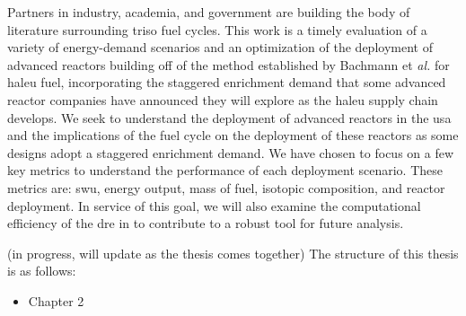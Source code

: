 Partners in industry, academia, and government are building the body of
literature surrounding \gls{triso} fuel cycles. This work is a timely
evaluation of a variety of energy-demand scenarios and an optimization of the
deployment of advanced reactors building off of the method established by
Bachmann et \textit{al.} \cite{bachmann_enrichment_2021} for \gls{haleu} fuel,
incorporating the staggered enrichment demand that some advanced reactor
companies have announced they will explore as the \gls{haleu} supply chain
develops. We seek to understand the deployment of advanced reactors in the
\gls{usa} and the implications of the fuel cycle on the deployment of these
reactors as some designs adopt a staggered enrichment demand. We have chosen to
focus on a few key metrics to understand the performance of each deployment
scenario. These metrics are: \gls{swu}, energy output, mass of fuel, isotopic
composition, and reactor deployment. In service of this goal, we will also
examine the computational efficiency of the \gls{dre} in \cyclus to contribute
to a robust tool for future analysis.


\pagebreak

(in progress, will update as the thesis comes together)
The structure of this thesis is as follows:

\begin{itemize}
    \item Chapter 2
\end{itemize}